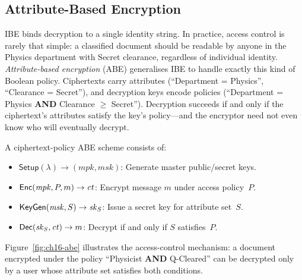 \subsection{Attribute-Based Encryption}
\label{subsec:abe}

IBE binds decryption to a single identity string.  In practice, access control is rarely that simple: a classified document should be readable by anyone in the Physics department with Secret clearance, regardless of individual identity.  \emph{Attribute-based encryption} (ABE) generalises IBE to handle exactly this kind of Boolean policy.  Ciphertexts carry attributes (``Department = Physics'', ``Clearance = Secret''), and decryption keys encode policies (``Department = Physics \textbf{AND} Clearance $\geq$ Secret'').  Decryption succeeds if and only if the ciphertext's attributes satisfy the key's policy---and the encryptor need not even know who will eventually decrypt.

\begin{definition}
\label{def:cp-abe}
A ciphertext-policy ABE scheme consists of:
\begin{itemize}
\item $\mathsf{Setup}(\lambda) \to (\mathit{mpk}, \mathit{msk})$: Generate master public/secret keys.
\item $\mathsf{Enc}(\mathit{mpk}, P, m) \to \mathit{ct}$: Encrypt message $m$ under access policy~$P$.
\item $\mathsf{KeyGen}(\mathit{msk}, S) \to \mathit{sk}_S$: Issue a secret key for attribute set~$S$.
\item $\mathsf{Dec}(\mathit{sk}_S, \mathit{ct}) \to m$: Decrypt if and only if $S$ satisfies~$P$.
\end{itemize}
\end{definition}

Figure~\ref{fig:ch16-abe} illustrates the access-control mechanism: a document encrypted under the policy ``Physicist \textbf{AND} Q-Cleared'' can be decrypted only by a user whose attribute set satisfies both conditions.

